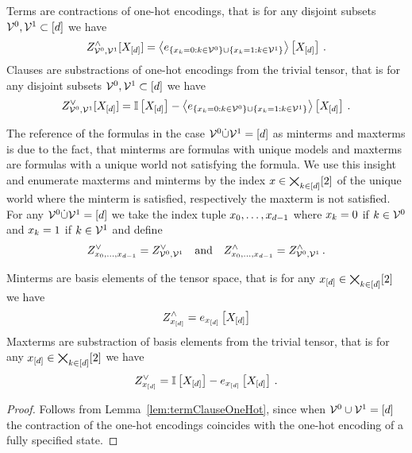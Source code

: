 \begin{lemma}\label{lem:termClauseOneHot}
	Terms are contractions of one-hot encodings, that is for any disjoint subsets $\mathcal{V}^{0},\mathcal{V}^{1}\subset[d]$ we have
		\[ Z^{\land}_{\mathcal{V}^{0},\mathcal{V}^{1}}[X_{[d]}] = \left\langle e_{\{x_{k}=0 : k\in\mathcal{V}^{0} \} \cup \{x_{k}=1 : k\in\mathcal{V}^{1}\}}\right\rangle \left[ X_{[d]} \right] \, . \]
	Clauses are substractions of one-hot encodings from the trivial tensor, that is for any disjoint subsets $\mathcal{V}^{0},\mathcal{V}^{1}\subset[d]$ we have
		\[ Z^{\lor}_{\mathcal{V}^{0},\mathcal{V}^{1}}[X_{[d]}] = 
		\mathbb{I}\left[X_{[d]}\right] -
		\left\langle e_{\{x_{k}=0 : k\in\mathcal{V}^{0} \} \cup \{x_{k}=1 : k\in\mathcal{V}^{1}\}}\right\rangle \left[ X_{[d]} \right] \, . \]
\end{lemma}


	
%
The reference of the formulas in the case $\mathcal{V}^{0}\dot{\cup}\mathcal{V}^{1} = [d]$ as minterms and maxterms is due to the fact, that minterms are formulas with unique models and maxterms are formulas with a unique world not satisfying the formula.
We use this insight and enumerate maxterms and minterms by the index $x\in\bigtimes_{k\in[d]}[2]$ of the unique world where the minterm is satisfied, respectively the maxterm is not satisfied.
For any $\mathcal{V}^{0}\dot{\cup}\mathcal{V}^{1} = [d]$ we take the index tuple $x_{0},\ldots,x_{d-1}$ where $x_{k}=0$ if $k\in\mathcal{V}^{0}$ and $x_{k}=1$ if $k\in\mathcal{V}^{1}$ and define
\begin{align*}
	Z^{\lor}_{x_{0},\ldots,x_{d-1}} = Z^{\lor}_{\mathcal{V}^{0},\mathcal{V}^{1}} \quad \text{and} \quad Z^{\land}_{x_{0},\ldots,x_{d-1}} = Z^{\land}_{\mathcal{V}^{0},\mathcal{V}^{1}} \, .
\end{align*}


\begin{corollary}
	Minterms are basis elements of the tensor space, that is for any $x_{[d]}\in\bigtimes_{k\in[d]}[2]$ we have
	\begin{align*}
		Z^{\land}_{x_{[d]}} = e_{x_{[d]}}\left[X_{[d]}\right]
	\end{align*}
	Maxterms are substraction of basis elements from the trivial tensor, that is for any $x_{[d]}\in\bigtimes_{k\in[d]}[2]$ we have
	\begin{align*}
		Z^{\lor}_{x_{[d]}} = \mathbb{I}\left[X_{[d]}\right] - e_{x_{[d]}}\left[X_{[d]}\right]  \, .
	\end{align*}
\end{corollary}
\begin{proof}
	Follows from Lemma~\ref{lem:termClauseOneHot}, since when $\mathcal{V}^{0}\cup\mathcal{V}^{1} = [d]$ the contraction of the one-hot encodings coincides with the one-hot encoding of a fully specified state.
\end{proof}


